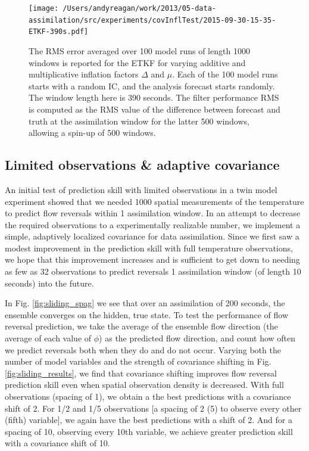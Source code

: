 \begin{figure}[h]
  \centering
  \texttt{[image: /Users/andyreagan/work/2013/05-data-assimilation/src/experiments/covInflTest/2015-09-30-15-35-ETKF-390s.pdf]}
  \caption[The RMS error averaged over 100 model runs of length 1000 windows is reported for the ETKF for varying additive and multiplicative inflation factors]{
    The RMS error averaged over 100 model runs of length 1000 windows is reported for the ETKF for varying additive and multiplicative inflation factors $\Delta$ and $\mu$.
    Each of the 100 model runs starts with a random IC, and the analysis forecast starts randomly.
    The window length here is 390 seconds.
    The filter performance RMS is computed as the RMS value of the difference between forecast and truth at the assimilation window for the latter 500 windows, allowing a spin-up of 500 windows.
  }
  \label{fig:ETKF_cov_tuning_390s}
\end{figure}

\subsection*{Limited observations \& adaptive covariance}

An initial test of prediction skill with limited observations in a twin model experiment showed that we needed 1000 spatial measurements of the temperature to predict flow reversals within 1 assimilation window.
In an attempt to decrease the required observations to a experimentally realizable number, we implement a simple, adaptively localized covariance for data assimilation.
Since we first saw a modest improvement in the prediction skill with full temperature observations, we hope that this improvement increases and is sufficient to get down to needing as few as 32 observations to predict reversals 1 assimilation window (of length 10 seconds) into the future.

In Fig. \ref{fig:sliding_spag} we see that over an assimilation of 200 seconds, the ensemble converges on the hidden, true state.
To test the performance of flow reversal prediction, we take the average of the ensemble flow direction (the average of each value of $\phi$) as the predicted flow direction, and count how often we predict reversals both when they do and do not occur.
Varying both the number of model variables and the strength of covariance shifting in Fig. \ref{fig:sliding_results}, we find that covariance shifting improves flow reversal prediction skill even when spatial observation density is decreased.
With full observations (spacing of 1), we obtain a the best predictions with a covariance shift of 2.
For 1/2 and 1/5 observations [a spacing of 2 (5) to observe every other (fifth) variable], we again have the best predictions with a shift of 2.
And for a spacing of 10, observing every 10th variable, we achieve greater prediction skill with a covariance shift of 10.


